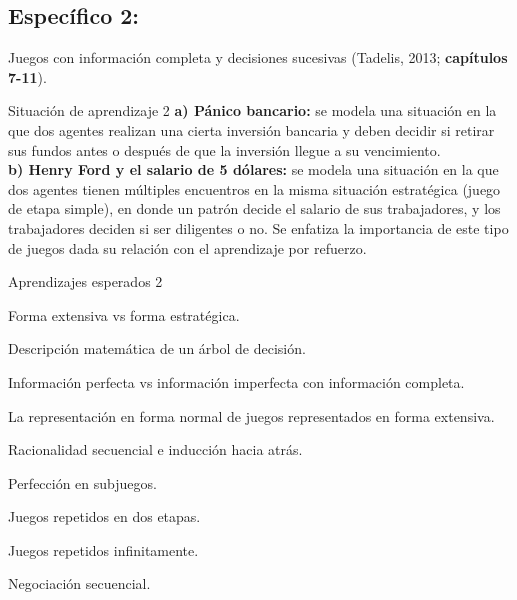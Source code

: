 \documentclass[11pt]{article}
\newenvironment{tight_enumerate}{
	\begin{enumerate}
		\setlength{\itemsep}{0pt}
		\setlength{\parskip}{0pt}
	}{\end{enumerate}}
\begin{document}
\begin{tcolorbox}[colback=bluerow!60]
	\subsection{Específico 2: }
		Juegos con información completa y decisiones sucesivas (Tadelis, 2013; \textbf{capítulos 7-11}).
	\begin{mybox}[colback=redrow!80]{Situación de aprendizaje 2}
		\textbf{a)	Pánico bancario:} se modela una situación en la que dos agentes realizan una cierta inversión bancaria y deben decidir si retirar sus fundos antes o después de que la inversión llegue a su vencimiento.\\
		\textbf{b)	Henry Ford y el salario de 5 dólares:} se modela una situación en la que dos agentes tienen múltiples encuentros en la misma situación estratégica (juego de etapa simple), en donde un patrón decide el salario de sus trabajadores, y los trabajadores deciden si ser diligentes o no. Se enfatiza la importancia de este tipo de juegos dada su relación con el aprendizaje por refuerzo.
		
	\end{mybox}
	
	\begin{mybox}[colback=purplerow!80]{Aprendizajes esperados 2}
		\begin{tight_enumerate}
			\item Forma extensiva vs forma estratégica. 
			\item Descripción matemática de un árbol de decisión.
			\item Información perfecta vs información imperfecta con información completa.
			\item La representación en forma normal de juegos representados en forma extensiva. 
			\item Racionalidad secuencial e inducción hacia atrás. 
			\item Perfección en subjuegos. 
			\item Juegos repetidos en dos etapas. 
			\item Juegos repetidos infinitamente. 
			\item Negociación secuencial.
		\end{tight_enumerate}
	\end{mybox}
\end{tcolorbox}
\end{document}
